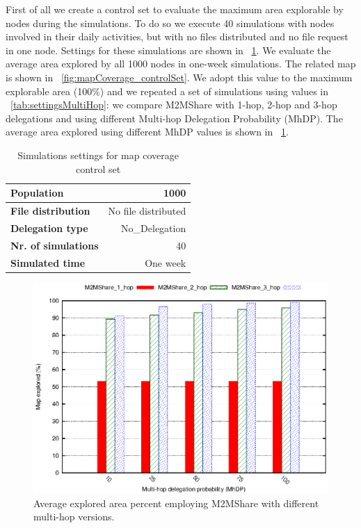 First of all we create a control set to evaluate the maximum area explorable by nodes during the simulations. To do so we execute 40 simulations with nodes involved in their daily activities, but with no files distributed and no file request in one node. Settings for these simulations are shown in \tablename~\ref{tab:settingsControlSet}. We evaluate the average area explored by all 1000 nodes in one-week simulations. The related map is shown in  \figurename~\ref{fig:mapCoverage_controlSet}. We adopt this value to the maximum explorable area (100\%) and we repeated a set of simulations using values in \tablename~\ref{tab:settingsMultiHop}: we compare M2MShare with 1-hop, 2-hop and 3-hop delegations and using different Multi-hop Delegation Probability (MhDP). The average area explored using different MhDP values is shown in \figurename~\ref{fig:mapCoverage_MultiHop}.
\\



\begin{table}[h]
\begin{center}
\begin{tabular}[width=4cm]{|l|r|}
\hline
\bfseries Population & 1000 \\
\hline
\bfseries File distribution & No file distributed \\
\hline
\bfseries Delegation type & No\_Delegation \\
\hline
\bfseries Nr. of simulations & 40\\
\hline
\bfseries Simulated time & One week \\
\hline
\end{tabular}
\end{center}
\caption{Simulations settings for map coverage control set\label{tab:settingsControlSet}}
\end{table}

\begin{figure}[htpb]
  \begin{center}
    \includegraphics{grafici/mapCovered_MultiHop.eps}
    \caption{Average explored area percent employing M2MShare with different multi-hop versions.}
    \label{fig:mapCoverage_MultiHop}
  \end{center}
\end{figure}

